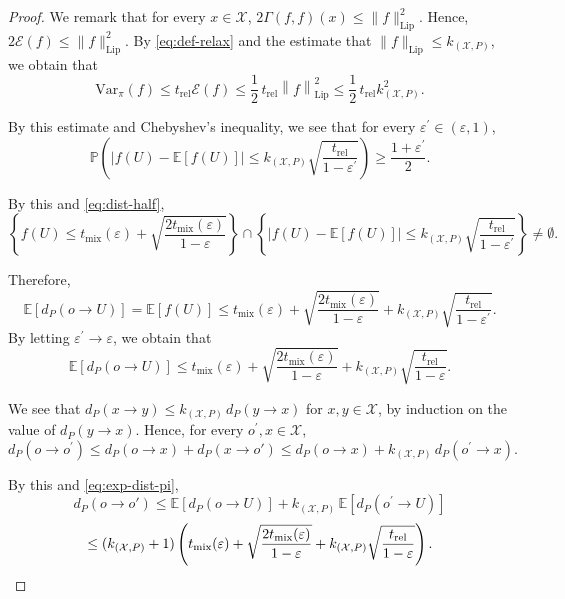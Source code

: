 \documentclass[10pt,a4paper]{amsart}
\theoremstyle{plain}
\theoremstyle{definition}
\begin{document}
\begin{proof}
We remark that for every $x \in \mathcal{X}$, $2\Gamma(f,f)(x) \le \|f\|_{\mathrm{Lip}}^2$.
Hence, $2\mathcal{E}(f) \le \|f\|_{\mathrm{Lip}}^2$.
By \eqref{eq:def-relax} and the estimate that $\|f\|_{\mathrm{Lip}} \le k_{(\mathcal{X}, P)}$,
we obtain that
\[ \mathrm{Var}_\pi (f)\le t_{\mathrm{rel}}\mathcal{E}(f) \le \frac{1}{2}\, t_{\mathrm{rel}} \left\|f \right\|_{\mathrm{Lip}}^2 \le \frac{1}{2}\, t_{\mathrm{rel}} k_{(\mathcal{X}, P)}^2. \]

By this estimate and Chebyshev's inequality, we see that for every $\varepsilon^{\prime} \in (\varepsilon, 1)$, 
\begin{equation*}
\mathbb{P}\left(\left|f(U)- \mathbb{E}[f(U)]\right|\le k_{(\mathcal{X}, P)}\sqrt{\frac{t_{\mathrm{rel}}}{1-\varepsilon^{\prime} }} \right)\ge \frac{1+\varepsilon^{\prime} }{2}.
\end{equation*}

By this and \eqref{eq:dist-half}, 
\[ \left\{f(U)\le t_{\mathrm{mix}}(\varepsilon) + \sqrt{\frac{2 t_{\mathrm{mix}}(\varepsilon)}{1-\varepsilon}}\right\} \cap \left\{\left|f(U)- \mathbb{E}[f(U)]\right|\le k_{(\mathcal{X}, P)}\sqrt{\frac{t_{\mathrm{rel}}}{1-\varepsilon^{\prime} }}\right\} \ne \emptyset. \]

Therefore,
\[  \mathbb{E}\left[d_P (o \to U) \right] = \mathbb{E}[f(U)] \le t_{\mathrm{mix}}(\varepsilon) + \sqrt{\frac{2t_{\mathrm{mix}}(\varepsilon)}{1-\varepsilon}} +k_{(\mathcal{X}, P)}\sqrt{\frac{t_{\mathrm{rel}}}{1-\varepsilon^{\prime} }}. \]
By letting $\varepsilon^{\prime} \to \varepsilon$,
we obtain that
\begin{equation}\label{eq:exp-dist-pi}
\mathbb{E}\left[d_P (o \to U) \right] \le t_{\mathrm{mix}}(\varepsilon) + \sqrt{\frac{2t_{\mathrm{mix}}(\varepsilon) }{1-\varepsilon}} +k_{(\mathcal{X}, P)}\sqrt{\frac{t_{\mathrm{rel}}}{1-\varepsilon}}.
\end{equation}

We see that
$d_P (x \to y) \le k_{(\mathcal{X}, P)}\,d_P (y \to x)$ for $x, y \in \mathcal{X}$,
by induction on the value of $d_P (y\to x)$.
Hence, for every $o^{\prime}, x \in \mathcal{X}$,
\[ d_P (o \to o^{\prime}) \le d_P (o\to x) + d_P (x\to o') \le d_P (o\to x)+k_{(\mathcal{X}, P)}\,d_P (o^{\prime} \to x). \]

By this and \eqref{eq:exp-dist-pi},
\[ d_P (o \to o') \le \mathbb{E}[d_P (o\to U)] + k_{(\mathcal{X}, P)}\, \mathbb{E}\left[d_P (o^{\prime}  \to U)\right] \]
\[ \le (k_{(\mathcal{X}, P)}+1)\left(t_{\mathrm{mix}}(\varepsilon) + \sqrt{\frac{2 t_{\mathrm{mix}}(\varepsilon)}{1-\varepsilon}} +k_{(\mathcal{X}, P)}\sqrt{\frac{t_{\mathrm{rel}}}{1-\varepsilon}} \right). \qedhere \]
\end{proof}
\end{document}
